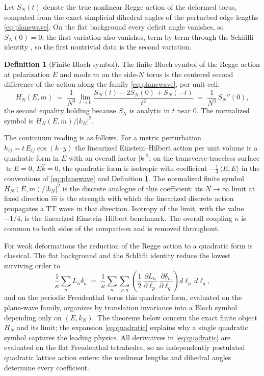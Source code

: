 \documentclass[11pt]{article}
\theoremstyle{definition}
\newtheorem{definition}[theorem]{Definition}
\theoremstyle{remark}
\DeclareMathOperator{\tr}{tr}
\begin{document}
Let $S_N(t)$ denote the true nonlinear Regge action of the deformed torus, computed from the exact simplicial dihedral angles of the perturbed edge lengths \eqref{eq:planewave}. On the flat background every deficit angle vanishes, so $S_N(0)=0$; the first variation also vanishes, term by term through the Schl\"afli identity \cite{RocekWilliams, CMS}, so the first nontrivial data is the second variation.

\begin{definition}[Finite Bloch symbol]
\label{def:symbol}
The finite Bloch symbol of the Regge action at polarization $E$ and mode $m$ on the side-$N$ torus is the centered second difference of the action along the family \eqref{eq:planewave}, per unit cell:
\begin{equation}
H_N(E,m) \;=\; \frac{1}{N^3}\,\lim_{t\to 0}\frac{S_N(t)-2S_N(0)+S_N(-t)}{t^2}
\;=\;\frac{1}{N^3}\,S_N''(0),
\end{equation}
the second equality holding because $S_N$ is analytic in $t$ near $0$. The normalized symbol is $H_N(E,m)/|k_N|^2$.
\end{definition}

The continuum reading is as follows. For a metric perturbation $h_{ij} = t\,E_{ij}\cos(k\cdot y)$ the linearized Einstein--Hilbert action per unit volume is a quadratic form in $E$ with an overall factor $|k|^2$; on the transverse-traceless surface $\tr E = 0$, $E\hat k = 0$, the quadratic form is isotropic with coefficient $-\tfrac14\,\langle E,E\rangle$ in the conventions of \eqref{eq:planewave} and Definition \ref{def:symbol}. The normalized finite symbol $H_N(E,m)/|k_N|^2$ is the discrete analogue of this coefficient: its $N\to\infty$ limit at fixed direction $\hat m$ is the strength with which the linearized discrete action propagates a TT wave in that direction. Isotropy of the limit, with the value $-1/4$, is the linearized Einstein--Hilbert benchmark. The overall coupling $\kappa$ is common to both sides of the comparison and is removed throughout.

For weak deformations the reduction of the Regge action to a quadratic form is classical. The flat background and the Schl\"afli identity reduce the lowest surviving order to \cite{RocekWilliams}
\begin{equation}
\frac{1}{\kappa}\sum_{n} L_n \delta_n \;=\; \frac{1}{\kappa}\sum_n \sum_{p,q}\left(\frac12\,\frac{\partial L_n}{\partial \ell_p}\,\frac{\partial \delta_n}{\partial \ell_q}\right) d\ell_p\, d\ell_q,
\label{eq:quadratic}
\end{equation}
and on the periodic Freudenthal torus this quadratic form, evaluated on the plane-wave family, organizes by translation invariance into a Bloch symbol depending only on $(E, k_N)$. The theorems below concern the exact finite object $H_N$ and its limit; the expansion \eqref{eq:quadratic} explains why a single quadratic symbol captures the leading physics. All derivatives in \eqref{eq:quadratic} are evaluated on the flat Freudenthal tetrahedra, so no independently postulated quadratic lattice action enters: the nonlinear lengths and dihedral angles determine every coefficient.
\end{document}
